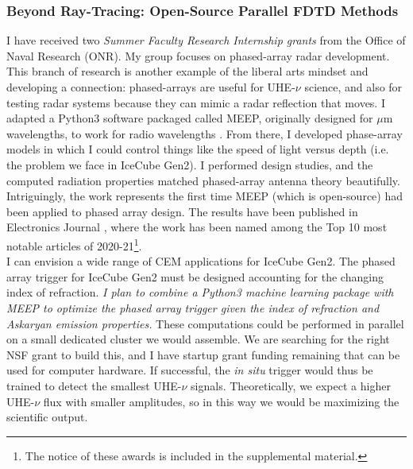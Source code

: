 \documentclass[../../../main.tex]{subfiles}
\begin{document}
\subsubsection{Beyond Ray-Tracing: Open-Source Parallel FDTD Methods}
\label{sec:cem_cluster}

I have received two \textit{Summer Faculty Research Internship grants} from the Office of Naval Research (ONR).  My group focuses on phased-array radar development.  This branch of research is another example of the liberal arts mindset and developing a connection: phased-arrays are useful for UHE-$\nu$ science, and also for testing radar systems because they can mimic a radar reflection that moves.  I adapted a Python3 software packaged called MEEP, originally designed for $\mu$m wavelengths, to work for radio wavelengths \cite{10.1016/j.cpc.2009.11.008}.  From there, I developed phase-array models in which I could control things like the speed of light versus depth (i.e. the problem we face in IceCube Gen2).  I performed design studies, and the computed radiation properties matched phased-array antenna theory beautifully.  Intriguingly, the work represents the first time MEEP (which is open-source) had been applied to phased array design.  The results have been published in Electronics Journal \cite{electronics10040415}, where the work has been named among the Top 10 most notable articles of 2020-21\footnote{The notice of these awards is included in the supplemental material.}.
\\
\vspace{0.15cm}
I can envision a wide range of CEM applications for IceCube Gen2.  The phased array trigger for IceCube Gen2 must be designed accounting for the changing index of refraction.  \textit{I plan to combine a Python3 machine learning package with MEEP to optimize the phased array trigger given the index of refraction and Askaryan emission properties.}  These computations could be performed in parallel on a small dedicated cluster we would assemble.  We are searching for the right NSF grant to build this, and I have startup grant funding remaining that can be used for computer hardware.  If successful, the \textit{in situ} trigger would thus be trained to detect the smallest UHE-$\nu$ signals.  Theoretically, we expect a higher UHE-$\nu$ flux with smaller amplitudes, so in this way we would be maximizing the scientific output.
\end{document}
